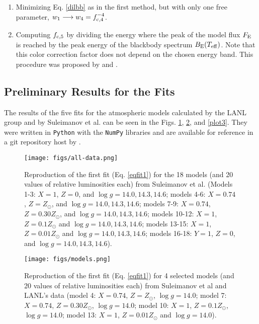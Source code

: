 {\begin{enumerate}
 
\quad


 \item Minimizing Eq. \ref{dilbb} as in the first method, but with only one free parameter, \ie $w_1 \longrightarrow
w_4=f^{-4}_{\rm c,4}$.
 
\quad

 \item Computing $f_{\rm c,5}$ by dividing the energy where the peak of the model flux $F_{\rm E}$ is reached by the peak  energy of the blackbody spectrum $B_{\rm E}(T_{\rm eff})$. Note that this color correction factor does not depend on the chosen energy band. This  procedure was proposed by \cite{MAD04} and \cite{MAJ05}.
\end{enumerate}


\quad


\subsection{Preliminary Results for the  Fits}

The results of the five fits for the atmospheric models calculated by the LANL group and by Suleimanov et al. \cite{SPW10} can be seen in the Figs. \ref{plot1}, \ref{plot2}, and \ref{plot3}. They were written in \texttt{Python} \cite{py} with the \texttt{NumPy} libraries  \cite{numpy} and are available for reference in a git repository host by \cite{git}. 

\quad



 \begin{figure} [ht]
\texttt{[image: figs/all-data.png]}
\caption{Reproduction of the first fit (Eq. \ref{eqfit1}) for the 18 models (and 20 values of relative luminosities each)  from Suleimanov et al. \cite{SPW10} (Models 1-3: $X=1$, $Z=0$, and $\log g =14.0, 14.3, 14.6$; models 4-6: $X=0.74$, $Z=Z_{\odot}$, and $\log g =14.0, 14.3, 14.6$; models 7-9: $X=0.74$, $Z=0.30Z_{\odot}$, and $\log g =14.0, 14.3, 14.6$; models 10-12: $X=1$, $Z=0.1Z_{\odot}$ and $\log g =14.0, 14.3, 14.6$; models 13-15: $X=1$, $Z=0.01Z_{\odot}$ and $\log g =14.0, 14.3, 14.6$; models 16-18: $Y=1$, $Z=0$, and $\log g =14.0, 14.3, 14.6$).}
\label{plot1}
\end{figure} 



 \begin{figure} [ht]
\texttt{[image: figs/models.png]}
\caption{Reproduction of the first fit (Eq. \ref{eqfit1}) for  4 selected models (and 20 values of relative luminosities each) from Suleimanov et al \cite{SPW10} and LANL's data (model 4: $X=0.74$, $Z=Z_{\odot}$, $\log g =14.0$; model 7: $X=0.74$, $Z=0.30Z_{\odot}$,  $\log g =14.0$; model 10: $X=1$, $Z=0.1Z_{\odot}$, $\log g =14.0$; model 13: $X=1$, $Z=0.01Z_{\odot}$ and $\log g =14.0$).}
\label{plot2}
\end{figure} 




}
